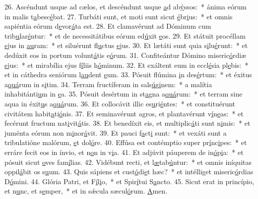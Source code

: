 26. Ascéndunt usque ad cælos, et descéndunt usque \uline{a}d ab\uline{ý}ssos:~* ánima eórum in malis t\uline{a}besc\uline{é}bat.
27. Turbáti sunt, et moti sunt sicut \uline{é}br\uline{i}us:~* et omnis sapiéntia eórum d\uline{e}vor\uline{á}ta est.
28. Et clamavérunt ad Dóminum cum trib\uline{u}lar\uline{é}ntur:~* et de necessitátibus eórum ed\uline{ú}xit \uline{e}os.
29. Et státuit procéllam \uline{e}jus in \uline{au}ram:~* et siluérunt fl\uline{u}ctus \uline{e}jus.
30. Et lætáti sunt quia s\uline{i}lu\uline{é}runt:~* et dedúxit eos in portum volunt\uline{á}tis e\uline{ó}rum.
31. Confiteántur Dómino miseric\uline{ó}rdiæ \uline{e}jus:~* et mirabília ejus f\uline{í}liis h\uline{ó}minum.
32. Et exáltent eum in eccl\uline{é}sia pl\uline{e}bis:~* et in cáthedra seniórum l\uline{au}dent \uline{e}um.
33. Pósuit flúmina \uline{i}n des\uline{é}rtum:~* et éxitus a\uline{quá}rum in s\uline{i}tim.
34. Terram fructíferam in sals\uline{ú}g\uline{i}nem:~* a malítia inhabitánti\uline{u}m in \uline{e}a.
35. Pósuit desértum in st\uline{a}gna a\uline{quá}rum:~* et terram sine aqua in éxit\uline{u}s a\uline{quá}rum.
36. Et collocávit illic es\uline{u}ri\uline{é}ntes:~* et constituérunt civitátem habit\uline{a}ti\uline{ó}nis.
37. Et seminavérunt agros, et plantavérunt v\uline{í}n\uline{e}as:~* et fecérunt fructum nat\uline{i}vit\uline{á}tis.
38. Et benedíxit eis, et multiplic\uline{á}ti sunt n\uline{i}mis:~* et juménta eórum non m\uline{i}nor\uline{á}vit.
39. Et pauci f\uline{a}ct\uline{i} sunt:~* et vexáti sunt a tribulatióne malórum, \uline{e}t dol\uline{ó}re.
40. Effúsa est contémptio super pr\uline{í}nc\uline{i}pes:~* et erráre fecit eos in ínvio, et n\uline{o}n in v\uline{i}a.
41. Et adjúvit páuperem de in\uline{ó}p\uline{i}a:~* et pósuit sicut \uline{o}ves fam\uline{í}lias.
42. Vidébunt recti, et l\uline{æ}tab\uline{ú}ntur:~* et omnis iníquitas oppil\uline{á}bit os s\uline{u}um.
43. Quis sápiens et cust\uline{ó}di\uline{e}t hæc?~* et intélliget miseric\uline{ó}rdias D\uline{ó}mini.
44. Glória Patri, et F\uline{í}l\uline{i}o,~* et Spir\uline{í}tui S\uline{a}ncto.
45. Sicut erat in princípio, et n\uline{u}nc, et s\uline{e}mper,~* et in sǽcula sæcul\uline{ó}rum. \uline{A}men.
